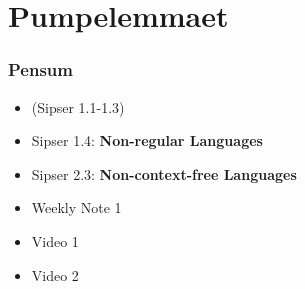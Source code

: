 \section{Pumpelemmaet}%
\label{sec:Pumpelemma}

\begin{frame}
  \frametitle{Pensum}
  \begin{itemize}
    \item (Sipser 1.1-1.3)
    \item Sipser 1.4: \textbf{Non-regular Languages}
    \item Sipser 2.3: \textbf{Non-context-free Languages}
    \item Weekly Note 1
    \item Video 1
    \item Video 2
  \end{itemize}
\end{frame}



